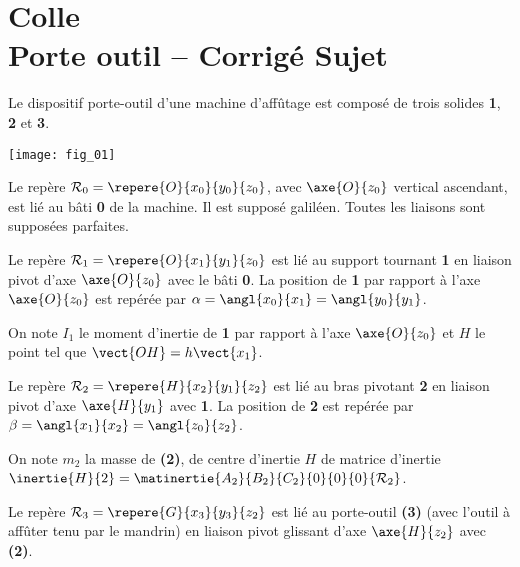 \chapter*{Colle  \\ 
Porte outil -- \ifprof Corrigé \else Sujet \fi}

\iflivret {} \else
\ifprof  {} \else \fi
\fi

\setcounter{question}{0}


Le dispositif porte-outil d'une machine d'affûtage est composé de trois solides \textbf{1}, \textbf{2} et \textbf{3}. 

\begin{marginfigure}
\texttt{[image: fig\_01]}
\end{marginfigure}

Le repère $\mathcal{R}_0=\repere{O}{x_0}{y_0}{z_0}$, avec $\axe{O}{{z_0}}$ vertical ascendant, est lié au bâti \textbf{0} de la machine. Il est supposé galiléen. Toutes les liaisons sont supposées parfaites.

Le repère $\mathcal{R}_1=\repere{O}{x_1}{y_1}{z_0}$ est lié au support tournant \textbf{1} en liaison pivot d'axe $\axe{O}{z_0}$ avec le bâti \textbf{0}. La position de \textbf{1} par rapport à l'axe $\axe{O}{z_0}$ est repérée par $\alpha=\angl{x_0}{x_1}=\angl{y_0}{y_1}$. 

On note $I_1$ le moment d'inertie de \textbf{1} par rapport à l'axe $\axe{O}{z_0}$ et $H$ le point tel que $\vect{OH}=h\vect{x_1}$.

Le repère $\mathcal{R}_2=\repere{H}{x_2}{y_1}{z_2}$ est lié au bras pivotant \textbf{2} en liaison pivot d'axe $\axe{H}{{y_1}}$ avec \textbf{1}. La position de \textbf{2} est repérée par $\beta=\angl{x_1}{x_2}=\angl{z_0}{z_2}$. 

On note $m_2$ la masse de \textbf{(2)}, de centre d'inertie $H$ de matrice d'inertie $\inertie{H}{2}=\matinertie{A_2}{B_2}{C_2}{0}{0}{0}{\mathcal{R}_2}$.

Le repère $\mathcal{R}_3=\repere{G}{x_3}{y_3}{z_2}$ est lié au porte-outil  \textbf{(3)} (avec l'outil à affûter tenu par le mandrin) en liaison pivot glissant d'axe $\axe{H}{z_2}$ avec \textbf{(2)}. 

